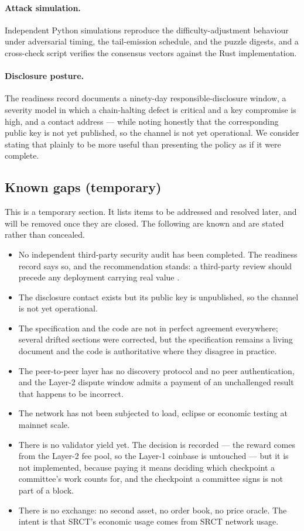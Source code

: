 \documentclass{article}
\begin{document}
\paragraph{Attack simulation.} Independent Python simulations reproduce the
difficulty-adjustment behaviour under adversarial timing, the tail-emission
schedule, and the puzzle digests, and a cross-check script verifies the
consensus vectors against the Rust implementation.

\paragraph{Disclosure posture.} The readiness record documents a ninety-day
responsible-disclosure window, a severity model in which a chain-halting defect
is critical and a key compromise is high, and a contact address --- while
noting honestly that the corresponding public key is not yet published, so the
channel is not yet operational. We consider stating that plainly to be more
useful than presenting the policy as if it were complete.

\subsection{Known gaps (temporary)}
\label{sec:gaps}

This is a temporary section. It lists items to be addressed and resolved later,
and will be removed once they are closed. The following are known and are stated
rather than concealed.

\begin{itemize}
\item No independent third-party security audit has been completed. The
readiness record says so, and the recommendation stands: a third-party review
should precede any deployment carrying real value \cite{srct-readiness}.
\item The disclosure contact exists but its public key is unpublished, so the
channel is not yet operational.
\item The specification and the code are not in perfect agreement everywhere;
several drifted sections were corrected, but the specification remains a
living document and the code is authoritative where they disagree in
practice.
\item The peer-to-peer layer has no discovery protocol and no peer
authentication, and the Layer-2 dispute window admits a payment of an
unchallenged result that happens to be incorrect.
\item The network has not been subjected to load, eclipse or economic testing
at mainnet scale.
\item There is no validator yield yet. The decision is recorded --- the reward
comes from the Layer-2 fee pool, so the Layer-1 coinbase is untouched --- but
it is not implemented, because paying it means deciding which checkpoint a
committee's work counts for, and the checkpoint a committee signs is not part
of a block.
\item There is no exchange: no second asset, no order book, no price oracle.
The intent is that SRCT's economic usage comes from SRCT network usage.
\end{itemize}
\end{document}
